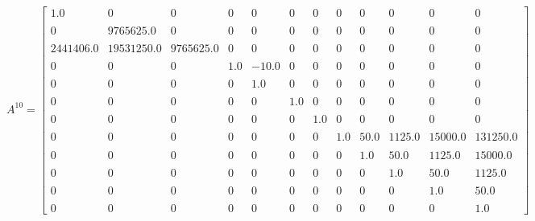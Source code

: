 \documentclass[a4paper,12pt]{article}
\begin{document}
\begin{landscape}
	$$
	A^{10}=\begin{bmatrix}
	1.0	&	0	&	0	&	0	&	0	&	0	&	0	&	0	&	0	&	0	&	0	&	0\\\\
	0	&	9765625.0	&	0	&	0	&	0	&	0	&	0	&	0	&	0	&	0	&	0	&	0\\\\
	2441406.0	&	19531250.0	&	9765625.0	&	0	&	0	&	0	&	0	&	0	&	0	&	0	&	0	&	0\\\\
	0	&	0	&	0	&	1.0	&	-10.0	&	0	&	 0	&	0	&	0	&	0	&	0	&	0\\\\
	0	&	0	&	0	&	0	&	1.0	&	0	&	0	&	0	&	0	&	0	&	0	&	0\\\\
	0	&	0	&	0	&	0	&	0	&	1.0	&	0	&	0	&	0	&	0	&	0	&	0\\\\
	0	&	0	&	0	&	0	&	0	&	0	&	1.0	&	0	&	0	&	0	&	0	&	0\\\\
	0	&	0	&	0	&	0	&	0	&	0	&	0	&	1.0	&	50.0	&	1125.0	&	15000.0	&	131250.0\\\\
	0	&	0	&	0	&	0	&	0	&	0	&	0	&	0	&	1.0	&	50.0	&	1125.0	&	15000.0\\\\
	0	&	0	&	0	&	0	&	0	&	0	&	0	&	0	&	0	&	1.0	&	50.0	&	1125.0\\\\
	0	&	0	&	0	&	0	&	0	&	0	&	0	&	0	&	0	&	0	&	1.0	&	50.0\\\\
	0	&	0	&	0	&	0	&	0	&	0	&	0	&	0	&	0	&	0	&	0	&	1.0
	\end{bmatrix}	
	$$    
\end{landscape}
\end{document}
